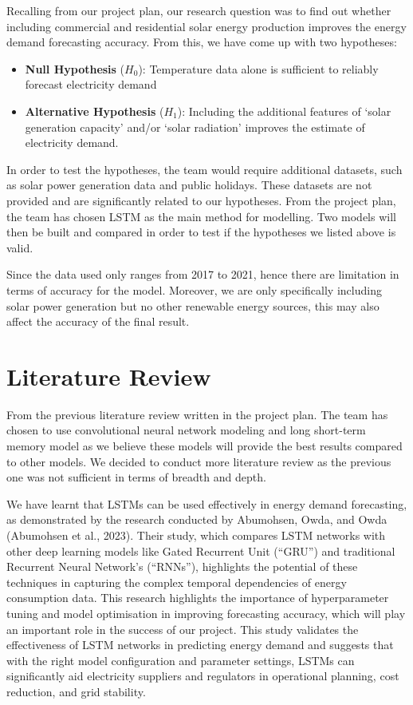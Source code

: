 \documentclass[mstat,12pt]{unswthesis}
\begin{document}
Recalling from our project plan, our research question was to find out
whether including commercial and residential solar energy production
improves the energy demand forecasting accuracy. From this, we have come
up with two hypotheses:

\begin{itemize}
\item
  \textbf{Null Hypothesis} (\(H_0\)): Temperature data alone is
  sufficient to reliably forecast electricity demand
\item
  \textbf{Alternative Hypothesis} (\(H_1\)): Including the additional
  features of `solar generation capacity' and/or `solar radiation'
  improves the estimate of electricity demand.
\end{itemize}

In order to test the hypotheses, the team would require additional
datasets, such as solar power generation data and public holidays. These
datasets are not provided and are significantly related to our
hypotheses. From the project plan, the team has chosen LSTM as the main
method for modelling. Two models will then be built and compared in
order to test if the hypotheses we listed above is valid.

Since the data used only ranges from 2017 to 2021, hence there are
limitation in terms of accuracy for the model. Moreover, we are only
specifically including solar power generation but no other renewable
energy sources, this may also affect the accuracy of the final result.

\section{Literature Review}\label{literature-review}

From the previous literature review written in the project plan. The
team has chosen to use convolutional neural network modeling and long
short-term memory model as we believe these models will provide the best
results compared to other models. We decided to conduct more literature
review as the previous one was not sufficient in terms of breadth and
depth.

We have learnt that LSTMs can be used effectively in energy demand
forecasting, as demonstrated by the research conducted by Abumohsen,
Owda, and Owda (Abumohsen et al., 2023). Their study, which compares
LSTM networks with other deep learning models like Gated Recurrent Unit
(``GRU'') and traditional Recurrent Neural Network's (``RNNs''),
highlights the potential of these techniques in capturing the complex
temporal dependencies of energy consumption data. This research
highlights the importance of hyperparameter tuning and model
optimisation in improving forecasting accuracy, which will play an
important role in the success of our project. This study validates the
effectiveness of LSTM networks in predicting energy demand and suggests
that with the right model configuration and parameter settings, LSTMs
can significantly aid electricity suppliers and regulators in
operational planning, cost reduction, and grid stability.
\end{document}
